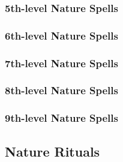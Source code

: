 \subsubsection{5th-level Nature Spells}
\begin{spelllist}
    \SLcurelightwoundsmass
    \SLfireseeds
    \SLfogshield
    \SLsummonnaturesallyv
    \SLtotemicmindgreater
    \SLtotemicpowergreater
    \SLwalloffiregreater
    \SLwindstrikegreater
\end{spelllist}

\subsubsection{6th-level Nature Spells}
\begin{spelllist}
    \SLcalllightninggreater
    \SLchainlightning
    \SLconeofcoldgreater
    \SLcuremoderatewoundsmass
    \SLdispelmagicgreater
    \SLheal
    \SLregeneration
    \SLskysmite
    \SLsolidfog
    \SLstormlord
    \SLsummonnaturesallyvi
    \SLsunburst
    \SLwallofthornsgreater
\end{spelllist}

\subsubsection{7th-level Nature Spells}
\begin{spelllist}
    \SLantilifeshell
    \SLcureseriouswoundsmass
    \SLfogsea
    \SLfreedommass
    \SLrotburstgreater
    \SLsummonnaturesallyvii
\end{spelllist}

\subsubsection{8th-level Nature Spells}
\begin{spelllist}
    \SLcurecriticalwoundsmass
    \SLfirestorm
    \SLsummonnaturesallyviii
    \SLsummonnaturesarmy
\end{spelllist}

\subsubsection{9th-level Nature Spells}
\begin{spelllist}
    \SLearthquake
    \SLstormofvengeance
\end{spelllist}

\subsection{Nature Rituals}\label{Nature Rituals}

